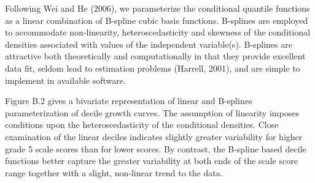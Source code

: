 \documentclass[12pt]{article}
\begin{document}
Following Wei and He (2006), we parameterize the conditional quantile
functions as a linear combination of B-spline cubic basis functions.
B-splines are employed to accommodate non-linearity, heteroscedasticity
and skewness of the conditional densities associated with values of the
independent variable(s). B-splines are attractive both theoretically and
computationally in that they provide excellent data fit, seldom lead to
estimation problems (Harrell, 2001), and are simple to implement in
available software.

Figure B.2 gives a bivariate representation of linear and B-splines
parameterization of decile growth curves. The assumption of linearity
imposes conditions upon the heteroscedasticity of the conditional
densities. Close examination of the linear deciles indicates slightly
greater variability for higher grade 5 scale scores than for lower
scores. By contrast, the B-spline based decile functions better capture
the greater variability at both ends of the scale score range together
with a slight, non-linear trend to the data.
\end{document}
